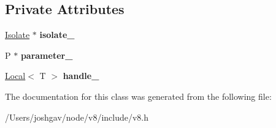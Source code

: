 \subsection*{Private Attributes}
\begin{DoxyCompactItemize}
\item 
\hyperlink{classv8_1_1_isolate}{Isolate} $\ast$ {\bfseries isolate\+\_\+}\hypertarget{classv8_1_1_weak_callback_data_ac08d995d95da3c172ec6d0ca610383ab}{}\label{classv8_1_1_weak_callback_data_ac08d995d95da3c172ec6d0ca610383ab}

\item 
P $\ast$ {\bfseries parameter\+\_\+}\hypertarget{classv8_1_1_weak_callback_data_a498f1f5d7bf69b62c4ea82dd716486cd}{}\label{classv8_1_1_weak_callback_data_a498f1f5d7bf69b62c4ea82dd716486cd}

\item 
\hyperlink{classv8_1_1_local}{Local}$<$ T $>$ {\bfseries handle\+\_\+}\hypertarget{classv8_1_1_weak_callback_data_a2b071a0330e236d48217d6ad3562d9ff}{}\label{classv8_1_1_weak_callback_data_a2b071a0330e236d48217d6ad3562d9ff}

\end{DoxyCompactItemize}


The documentation for this class was generated from the following file\+:\begin{DoxyCompactItemize}
\item 
/\+Users/joshgav/node/v8/include/v8.\+h\end{DoxyCompactItemize}
